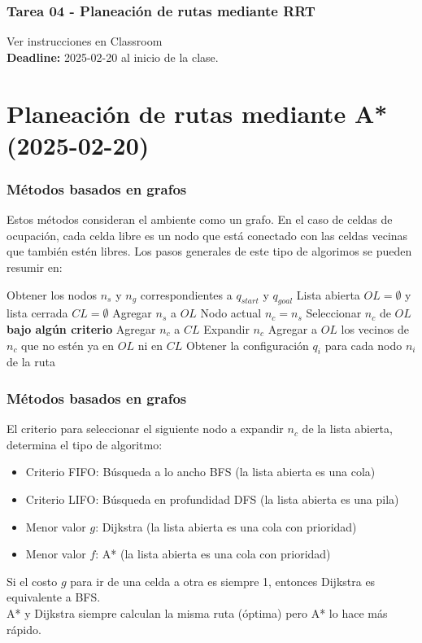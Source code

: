 \begin{frame}[containsverbatim]\frametitle{Tarea 04 - Planeación de rutas mediante RRT}
  Ver instrucciones en Classroom
  \[\]
  \textbf{Deadline: } 2025-02-20 al inicio de la clase. 
\end{frame}


\section{Planeación de rutas mediante A* (2025-02-20)}
\begin{frame}\frametitle{Métodos basados en grafos}
  Estos métodos consideran el ambiente como un grafo. En el caso de celdas de ocupación, cada celda libre es un nodo que está conectado con las celdas vecinas que también estén libres. Los pasos generales de este tipo de algorimos se pueden resumir en:
  \[\]
  \begin{algorithm}[H]
    \footnotesize
    \DontPrintSemicolon
    Obtener los nodos $n_s$ y $n_g$ correspondientes a $q_{start}$ y $q_{goal}$\;
    Lista abierta $OL = \emptyset$ y lista cerrada $CL = \emptyset$\;
    Agregar $n_s$ a $OL$\;
    Nodo actual $n_c = n_s$\;
    {
      Seleccionar $n_c$ de $OL$ \textbf{bajo algún criterio}\;
      Agregar $n_c$ a $CL$\;
      Expandir $n_c$\;
      Agregar a $OL$ los vecinos de $n_c$ que no estén ya en $OL$ ni en $CL$\;
    }
    Obtener la configuración $q_i$ para cada nodo $n_i$ de la ruta\;
  \end{algorithm}
\end{frame}

\begin{frame}\frametitle{Métodos basados en grafos}
  El criterio para seleccionar el siguiente nodo a expandir $n_c$ de la lista abierta, determina el tipo de algoritmo:
  \begin{itemize}
  \item Criterio FIFO: Búsqueda a lo ancho BFS (la lista abierta es una cola)
  \item Criterio LIFO:  Búsqueda en profundidad DFS (la lista abierta es una pila)
  \item Menor valor $g$: Dijkstra (la lista abierta es una cola con prioridad)
  \item Menor valor $f$: A* (la lista abierta es una cola con prioridad)
  \end{itemize}
  Si el costo $g$ para ir de una celda a otra es siempre 1, entonces Dijkstra es equivalente a BFS. \\
  A* y Dijkstra siempre calculan la misma ruta (óptima) pero A* lo hace más rápido. 
\end{frame}


